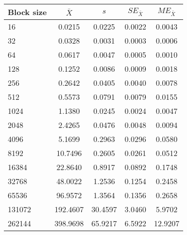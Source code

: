 \begin{tabular}{lcccc}\toprule
{\small Block size} & $\bar{X}$ & $s$ & $SE_{\bar{X}}$ & $ME_{\bar{X}}$ \\\midrule
16 & 0.0215 & 0.0225 & 0.0022 & 0.0043\\
32 & 0.0328 & 0.0031 & 0.0003 & 0.0006\\
64 & 0.0617 & 0.0047 & 0.0005 & 0.0010\\
128 & 0.1252 & 0.0086 & 0.0009 & 0.0018\\
256 & 0.2642 & 0.0405 & 0.0040 & 0.0078\\
512 & 0.5573 & 0.0791 & 0.0079 & 0.0155\\
1024 & 1.1380 & 0.0245 & 0.0024 & 0.0047\\
2048 & 2.4265 & 0.0476 & 0.0048 & 0.0094\\
4096 & 5.1699 & 0.2963 & 0.0296 & 0.0580\\
8192 & 10.7496 & 0.2605 & 0.0261 & 0.0512\\
16384 & 22.8640 & 0.8917 & 0.0892 & 0.1748\\
32768 & 48.0022 & 1.2536 & 0.1254 & 0.2458\\
65536 & 96.9572 & 1.3564 & 0.1356 & 0.2658\\
131072 & 192.4607 & 30.4597 & 3.0460 & 5.9702\\
262144 & 398.9698 & 65.9217 & 6.5922 & 12.9207\\
\bottomrule
\end{tabular}
